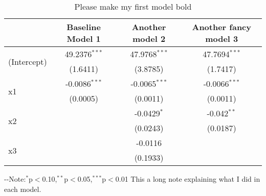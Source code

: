 \begin{table}[H] 
\centering 
\caption{Please make my first model bold} 
\label{tab:myLabel}
\begin{threeparttable}
\begin{tabular}{lccc}
\toprule 
& \textbf{Baseline Model} 1 & Another model 2 & Another fancy model 3 \\ 
\midrule 
\multirow{2}{*}{(Intercept)}&49.2376$^{***}$ & 47.9768$^{***}$ & 47.7694$^{***}$ \\ 
& (1.6411) & (3.8785) & (1.7417) \\ 
\multirow{2}{*}{x1}&-0.0086$^{***}$ & -0.0065$^{***}$ & -0.0066$^{***}$ \\ 
& (0.0005) & (0.0011) & (0.0011) \\ 
\multirow{2}{*}{x2}& &-0.0429$^{*}$ & -0.042$^{**}$ \\ 
&  &(0.0243) & (0.0187) \\ 
\multirow{2}{*}{x3}& &-0.0116 &  \\ 
&  &(0.1933) &  \\ 
\bottomrule 
\end{tabular} 
\begin{tablenotes} 
\scriptsize 
\item \leavevmode\kern-\scriptspace\kern- Note:$^{*}$p$<$0.10,$^{**}$p$<$0.05,$^{***}$p$<$0.01 This a long note explaining what I did in each model. 
\end{tablenotes}
\end{threeparttable} 
\end{table} 
 